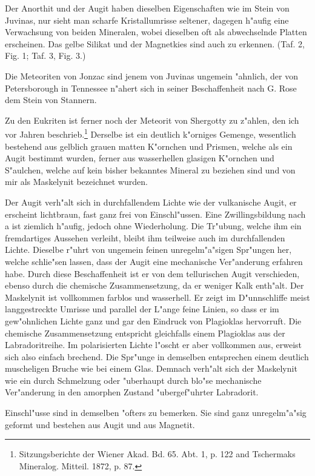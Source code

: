 \documentclass[a4paper, 11pt, oneside, polutonikogreek, german]{article}
\begin{document}
Der Anorthit und der Augit haben dieselben Eigenschaften wie im Stein von Juvinas, nur sieht man scharfe Kristallumrisse seltener, dagegen h"aufig eine Verwachsung von beiden Mineralen, wobei dieselben oft als abwechselnde Platten erscheinen. Das gelbe Silikat und der Magnetkies sind auch zu erkennen. (Taf. 2, Fig. 1; Taf. 3, Fig. 3.)

Die Meteoriten von Jonzac sind jenem von Juvinas ungemein "ahnlich, der von Petersborough in Tennessee n"ahert sich in seiner Beschaffenheit nach G. Rose dem Stein von Stannern.

Zu den Eukriten ist ferner noch der Meteorit von Shergotty zu z"ahlen, den ich vor Jahren beschrieb.\footnote{Sitzungsberichte der Wiener Akad. Bd. 65. Abt. 1, p. 122 and Tschermaks Mineralog. Mitteil. 1872, p. 87.} Derselbe ist ein deutlich k"orniges Gemenge, wesentlich bestehend aus gelblich grauen matten K"ornchen und Prismen, welche als ein Augit bestimmt wurden, ferner aus wasserhellen glasigen K"ornchen und S"aulchen, welche auf kein bisher bekanntes Mineral zu beziehen sind und von mir als Maskelynit bezeichnet wurden.

Der Augit verh"alt sich in durchfallendem Lichte wie der vulkanische Augit, er erscheint lichtbraun, fast ganz frei von Einschl"ussen. Eine Zwillingsbildung nach a ist ziemlich h"aufig, jedoch ohne Wiederholung. Die Tr"ubung, welche ihm ein fremdartiges Aussehen verleiht, bleibt ihm teilweise auch im durchfallenden Lichte. Dieselbe r"uhrt von ungemein feinen unregelm"a"sigen Spr"ungen her, welche schlie"sen lassen, dass der Augit eine mechanische Ver"anderung erfahren habe. Durch diese Beschaffenheit ist er von dem tellurischen Augit verschieden, ebenso durch die chemische Zusammensetzung, da er weniger Kalk enth"alt. Der Maskelynit ist vollkommen farblos und wasserhell. Er zeigt im D"unnschliffe meist langgestreckte Umrisse und parallel der L"ange feine Linien, so dass er im gew"ohnlichen Lichte ganz und gar den Eindruck von Plagioklas hervorruft. Die chemische Zusammensetzung entspricht gleichfalls einem Plagioklas aus der Labradoritreihe. Im polarisierten Lichte l"oscht er aber vollkommen aus, erweist sich also einfach brechend. Die Spr"unge in demselben entsprechen einem deutlich muscheligen Bruche wie bei einem Glas. Demnach verh"alt sich der Maskelynit wie ein durch Schmelzung oder "uberhaupt durch blo"se mechanische Ver"anderung in den amorphen Zustand "ubergef"uhrter Labradorit.

Einschl"usse sind in demselben "ofters zu bemerken. Sie sind ganz unregelm"a"sig geformt und bestehen aus Augit und aus Magnetit.
\end{document}
